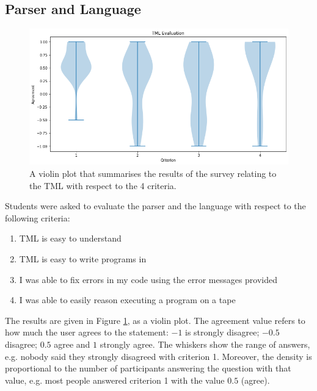 \begin{appendices}
\subsection{Parser and Language}
\begin{figure}[htb]
    \centering
    \includegraphics[scale=0.35]{images/tml-evaluation.png}
    \caption{A violin plot that summarises the results of the survey relating to the TML with respect to the 4 criteria.}
    \label{fig:tml-evaluation}
\end{figure}
Students were asked to evaluate the parser and the language with respect to the following criteria:
\begin{enumerate}
    \item TML is easy to understand
    \item TML is easy to write programs in
    \item I was able to fix errors in my code using the error messages provided
    \item I was able to easily reason executing a program on a tape
\end{enumerate}
The results are given in Figure \ref{fig:tml-evaluation}, as a violin plot. The agreement value refers to how much the user agrees to the statement: $-1$ is strongly disagree; $-0.5$ disagree; $0.5$ agree and $1$ strongly agree. The whiskers show the range of answers, e.g. nobody said they strongly disagreed with criterion 1. Moreover, the density is proportional to the number of participants answering the question with that value, e.g. most people answered criterion 1 with the value $0.5$ (agree).


\end{appendices}

